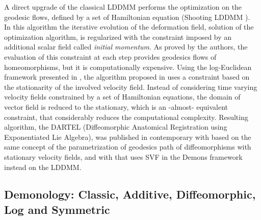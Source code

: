 A direct upgrade of the classical LDDMM performs the optimization on the geodesic flows, defined by a set of Hamiltonian equation (Shooting LDDMM \cite{vialard2012diffeomorphic}). \\
In this algorithm the iterative evolution of the deformation field, solution of the optimization algorithm, is regularized with the constraint imposed by an additional scalar field called \emph{initial momentum}. 
As proved by the authors, the evaluation of this constraint at each step provides geodesics flows of homeomorphisms, but it is computationally expensive. Using the log-Euclidean framework presented in \cite{Arsigny:MRM:06}, the algorithm proposed in \cite{Ashburner:07} uses a constraint based on the stationarity of the involved velocity field. Instead of considering time varying velocity fields constrained by a set of Hamiltonian equations, the domain of vector field is reduced to the stationary, which is an -almost- equivalent constraint, that considerably reduces the computational complexity. Resulting algorithm, the DARTEL (Diffeomorphic Anatomical Registration using Exponentiated Lie Algebra), was published in contemporary with \cite{hernandez2007registration} based on the same concept of the parametrization of geodesics path of diffeomorphisms with stationary velocity fields, and with \cite{vercauteren2007non} that uses SVF in the Demons framework instead on the LDDMM.



\subsection{Demonology: Classic, Additive, Diffeomorphic, Log and Symmetric}

